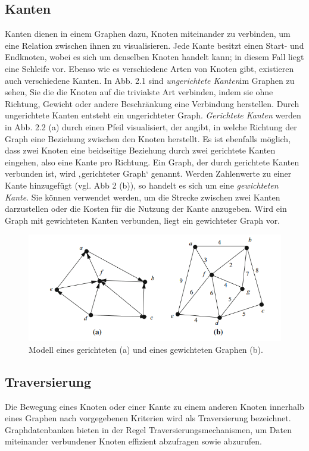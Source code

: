 \subsection{Kanten} %
\label{sec:kanten}
Kanten dienen in einem Graphen dazu, Knoten miteinander zu verbinden, um eine Relation zwischen ihnen zu visualisieren. Jede Kante besitzt einen Start- und Endknoten, wobei es sich um denselben Knoten handelt kann; in diesem Fall liegt eine Schleife vor. Ebenso wie es verschiedene Arten von Knoten gibt, existieren auch verschiedene Kanten. 
In Abb. 2.1 sind \textit{ungerichtete Kanten}im Graphen zu sehen, Sie die die Knoten auf die trivialste Art verbinden, indem sie ohne Richtung, Gewicht oder andere Beschränkung eine Verbindung herstellen. Durch ungerichtete Kanten entsteht ein ungerichteter Graph. 
\textit{Gerichtete Kanten} werden in Abb. 2.2 (a) durch einen Pfeil visualisiert, der angibt, in welche Richtung der Graph eine Beziehung zwischen den Knoten herstellt. Es ist ebenfalls möglich, dass zwei Knoten eine beidseitige Beziehung durch zwei gerichtete Kanten eingehen, also eine Kante pro Richtung. Ein Graph, der durch gerichtete Kanten verbunden ist, wird ‚gerichteter Graph‘ genannt. Werden Zahlenwerte zu einer Kante hinzugefügt (vgl. Abb 2 (b)), so handelt es sich um eine \textit{gewichteten Kante}. Sie können verwendet werden, um die Strecke zwischen zwei Kanten darzustellen oder die Kosten für die Nutzung der Kante anzugeben. Wird ein Graph mit gewichteten Kanten verbunden, liegt ein gewichteter Graph vor. \citep{graphTheory} \citep{graphapplication}
\begin{figure}[H]
	\centering
	\includegraphics[scale=1]{Illustrations/graph_01.png}
	\caption{Modell eines gerichteten (a) und eines gewichteten Graphen (b). \citep{graphTheory}}
\end{figure}

\subsection{Traversierung} %
\label{sec:traversierung}
Die Bewegung eines Knoten oder einer Kante zu einem anderen Knoten innerhalb eines Graphen nach vorgegebenen Kriterien wird als Traversierung bezeichnet. Graphdatenbanken bieten in der Regel Traversierungsmechanismen, um Daten miteinander verbundener Knoten effizient abzufragen sowie abzurufen. \cite{graph}


